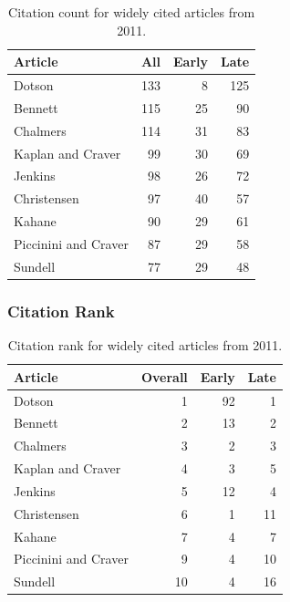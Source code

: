 \documentclass[
  10pt,
  letterpaper,
  DIV=11,
  numbers=noendperiod,
  twoside]{scrartcl}
\begin{document}
\begin{longtable}[]{@{}lrrr@{}}

\caption{\label{tbl-citation-count-2011}Citation count for widely cited
articles from 2011.}

\tabularnewline

\toprule\noalign{}
Article & All & Early & Late \\
\midrule\noalign{}
\endhead
\bottomrule\noalign{}
\endlastfoot
Dotson & 133 & 8 & 125 \\
Bennett & 115 & 25 & 90 \\
Chalmers & 114 & 31 & 83 \\
Kaplan and Craver & 99 & 30 & 69 \\
Jenkins & 98 & 26 & 72 \\
Christensen & 97 & 40 & 57 \\
Kahane & 90 & 29 & 61 \\
Piccinini and Craver & 87 & 29 & 58 \\
Sundell & 77 & 29 & 48 \\

\end{longtable}

\subsubsection*{Citation Rank}\label{sec-rank-2011}

\begin{longtable}[]{@{}lrrr@{}}

\caption{\label{tbl-citation-rank-2011}Citation rank for widely cited
articles from 2011.}

\tabularnewline

\toprule\noalign{}
Article & Overall & Early & Late \\
\midrule\noalign{}
\endhead
\bottomrule\noalign{}
\endlastfoot
Dotson & 1 & 92 & 1 \\
Bennett & 2 & 13 & 2 \\
Chalmers & 3 & 2 & 3 \\
Kaplan and Craver & 4 & 3 & 5 \\
Jenkins & 5 & 12 & 4 \\
Christensen & 6 & 1 & 11 \\
Kahane & 7 & 4 & 7 \\
Piccinini and Craver & 9 & 4 & 10 \\
Sundell & 10 & 4 & 16 \\

\end{longtable}
\end{document}
